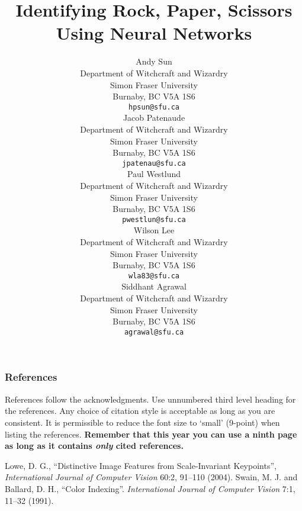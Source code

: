 \documentclass{article} %
\title{Identifying Rock, Paper, Scissors Using Neural Networks}
\author{
Andy Sun \\
Department of Witchcraft and Wizardry\\
Simon Fraser University\\
Burnaby, BC V5A 1S6 \\
\texttt{hpsun@sfu.ca} \\
\And
Jacob Patenaude \\
Department of Witchcraft and Wizardry\\
Simon Fraser University\\
Burnaby, BC V5A 1S6 \\
\texttt{jpatenau@sfu.ca} \\
\And
Paul Westlund \\
Department of Witchcraft and Wizardry\\
Simon Fraser University\\
Burnaby, BC V5A 1S6 \\
\texttt{pwestlun@sfu.ca} \\
\And
Wilson Lee \\
Department of Witchcraft and Wizardry\\
Simon Fraser University\\
Burnaby, BC V5A 1S6 \\
\texttt{wla83@sfu.ca} \\
\And
Siddhant Agrawal \\
Department of Witchcraft and Wizardry\\
Simon Fraser University\\
Burnaby, BC V5A 1S6 \\
\texttt{agrawal@sfu.ca} \\
}
\begin{document}
\maketitle

\begin{abstract}

\end{abstract}













\subsubsection*{References}

References follow the acknowledgments. Use unnumbered third level heading for
the references. Any choice of citation style is acceptable as long as you are
consistent. It is permissible to reduce the font size to `small' (9-point) 
when listing the references. {\bf Remember that this year you can use
a ninth page as long as it contains \emph{only} cited references.}

\begin{thebibliography}{99}
 Lowe, D. G., ``Distinctive Image Features from Scale-Invariant Keypoints'', \textit{International Journal of Computer Vision} 60:2, 91--110 (2004).
 Swain, M. J. and Ballard, D. H., ``Color Indexing''. \textit{International Journal of Computer Vision} 7:1, 11--32 (1991).
\end{thebibliography}
\end{document}
